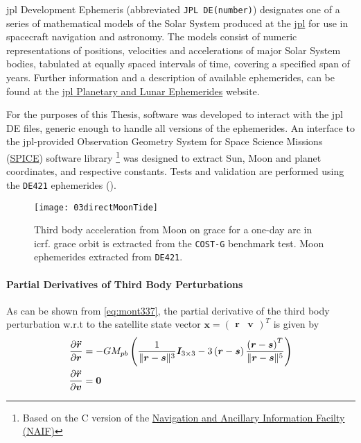 \gls{jpl} Development Ephemeris (abbreviated \texttt{JPL DE(number)}) 
designates one of a series of mathematical models of the Solar System produced at the 
\href{https://www.jpl.nasa.gov/}{\gls{jpl}} for use in spacecraft navigation and astronomy. 
The models consist of numeric representations of positions, velocities and accelerations 
of major Solar System bodies, tabulated at equally spaced intervals of time, covering 
a specified span of years. Further information and a description of 
available ephemerides, can be found at the 
\href{https://ssd.jpl.nasa.gov/planets/eph_export.html}{\gls{jpl} Planetary and Lunar Ephemerides} 
website.

For the purposes of this Thesis, software was developed to interact with the 
\gls{jpl} DE files, generic enough to handle all versions of the ephemerides. 
An interface to the \gls{jpl}-provided Observation Geometry System
for Space Science Missions (\href{https://naif.jpl.nasa.gov/naif/}{SPICE}) 
software library \footnote{Based on the C version of the 
\href{https://naif.jpl.nasa.gov/naif/toolkit_C.html}{Navigation and Ancillary Information Facilty (NAIF)}} 
was designed to extract Sun, Moon and planet coordinates, and respective constants. Tests and 
validation are performed using the \texttt{DE421} ephemerides (\cite{Folkner2009}).

\begin{figure}
  \centering
  \texttt{[image: 03directMoonTide]}
  \caption{Third body acceleration from Moon on \gls{grace} for a one-day arc in 
    \gls{icrf}. \gls{grace} orbit is extracted from the \texttt{COST-G} benchmark 
    test. Moon ephemerides extracted from \texttt{DE421}.}
  \label{fig:directMoonTideIcrf}
\end{figure}

\paragraph{Partial Derivatives of Third Body Perturbations}\label{par:third-body-perturbations-partials}

As can be shown from \autoref{eq:mont337}, the partial derivative of the third body 
perturbation w.r.t to the satellite state vector $\bm{x}=\begin{pmatrix}\bm{r} & \bm{v} \end{pmatrix}^T$ is given by
\begin{equation}
  \begin{aligned}
    \frac{\partial \bm{\ddot{r}}}{\partial \bm{r}} &= 
      -GM_{pb} \left( \frac{1}{\lVert\bm{r}-\bm{s}\rVert^3} \bm{I}_{3\times 3} 
      -3 \left(\bm{r}-\bm{s} \right) \frac{\left(\bm{r}-\bm{s} \right)^T}{\lVert\bm{r}-\bm{s}\rVert^5}
      \right) \\
    \frac{\partial \bm{\ddot{r}}}{\partial \bm{v}} &= \bm{0}
  \end{aligned}
\end{equation}

